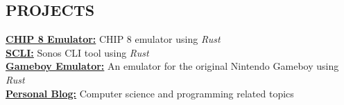 \documentclass[margin, 9pt]{res} %
\begin{document}
\begin{resume}



\section{PROJECTS}
\href{https://github.com/adamrmelnyk/chip_8_emulator}{\bf CHIP 8 Emulator:} CHIP 8 emulator using {\it Rust} \\
\href{https://github.com/adamrmelnyk/scli}{\bf SCLI:} Sonos CLI tool using {\it Rust} \\
\href{https://github.com/adamrmelnyk/oxide\_boy}{\bf Gameboy Emulator:} An emulator for the original Nintendo Gameboy using {\it Rust} \\
\href{https://arm64.ca}{\bf Personal Blog:} Computer science and programming related topics



\end{resume}
\end{document}
